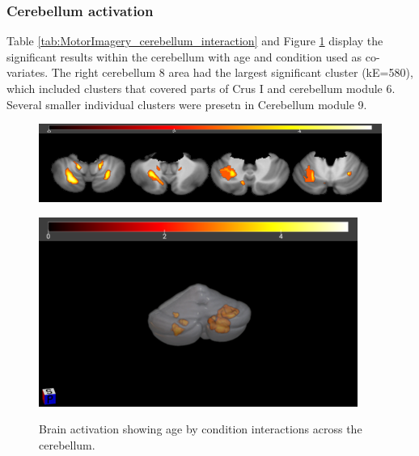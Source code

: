 \documentclass[a4paper,fleqn]{cas-sc}
\begin{document}
\subsubsection{Cerebellum activation}
Table \ref{tab:MotorImagery_cerebellum_interaction} and Figure \ref{fig:MotorImagery_cerebellum_interaction} display the significant results within the cerebellum with age and condition used as co-variates. The right cerebellum 8 area had the largest significant cluster (kE=580), which included clusters that covered parts of Crus I and cerebellum module 6. Several smaller individual clusters were presetn in Cerebellum module 9. 


\begin{figure}[ht]
    \centering
    \begin{minipage}{0.55\textwidth}
        \centering
        \includegraphics[clip, trim=0 0 0 0, width=\linewidth]{figs/cerebellumSlice_Interaction.png} %
         \label{fig:a}
    \end{minipage}
    \begin{minipage}{0.35\textwidth}
        \centering
        \includegraphics[clip, trim=0 0 0 0, width=\linewidth]{figs/cerebellum_Interaction.png} %
         \label{fig:b}
    \end{minipage}
    \caption{Brain activation showing age by condition interactions across the cerebellum. }
    \label{fig:MotorImagery_cerebellum_interaction}
\end{figure}
\end{document}

